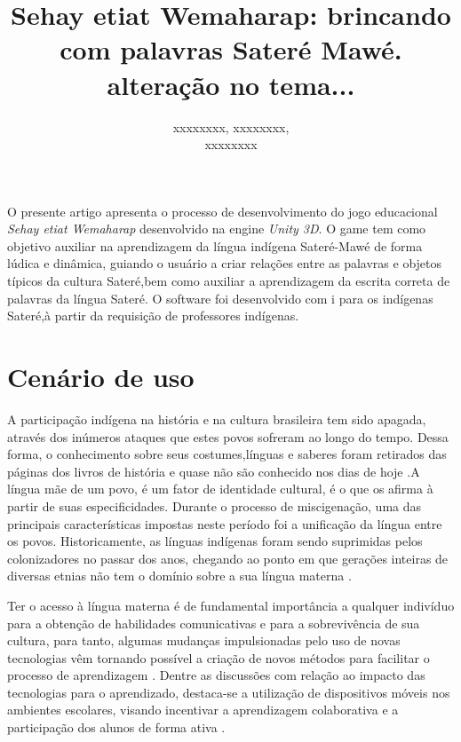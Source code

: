 \documentclass[12pt]{article}
\title{Sehay etiat Wemaharap: brincando com palavras Sateré Mawé. alteração no tema...}
\author{  xxxxxxxx, xxxxxxxx, \\ xxxxxxxx }
\begin{document}
 

\maketitle
	
	\begin{resumo} 
		O presente artigo apresenta o processo de desenvolvimento do jogo educacional  \textit{Sehay etiat Wemaharap} desenvolvido na engine \textit{Unity 3D}. O game tem como objetivo auxiliar na aprendizagem da língua indígena Sateré-Mawé de forma lúdica e dinâmica, guiando o usuário a criar relações entre as palavras e objetos típicos da cultura Sateré,bem como auxiliar a aprendizagem da escrita correta de palavras da língua Sateré. O software foi desenvolvido com i para os indígenas Sateré,à partir da requisição de professores indígenas.
	\end{resumo}
	
	\section{Cenário de uso}
		A participação indígena na história e na cultura brasileira tem sido apagada, através dos inúmeros ataques que estes povos sofreram ao longo do tempo. Dessa forma, o conhecimento sobre seus costumes,línguas e saberes foram retirados das páginas dos livros de história e quase não são conhecido nos dias de hoje \cite{seki2000linguas}.A língua mãe de um povo, é um fator de identidade cultural, é o que os afirma à partir de suas especificidades. Durante o processo de miscigenação, uma das principais características impostas neste período foi a unificação da língua entre os povos. Historicamente, as línguas indígenas foram sendo suprimidas pelos colonizadores no passar dos anos, chegando ao ponto em que gerações inteiras de diversas etnias não tem o domínio sobre a sua língua materna \cite{cunha2008politicas}.
		
		Ter o acesso à língua materna é de fundamental importância a qualquer indivíduo para a obtenção de habilidades comunicativas e para a sobrevivência de sua cultura\cite{de Souza Pires et al. 2018}, para tanto, algumas mudanças impulsionadas pelo uso de novas tecnologias vêm tornando possível a criação de novos métodos para facilitar o processo de aprendizagem \cite{yamato2017amargana}. Dentre as discussões com relação ao impacto das tecnologias para o aprendizado, destaca-se a utilização de dispositivos móveis nos ambientes escolares, visando incentivar a aprendizagem colaborativa e a participação dos alunos de forma ativa \cite{rossing2012ilearning}.
		
\end{document}
